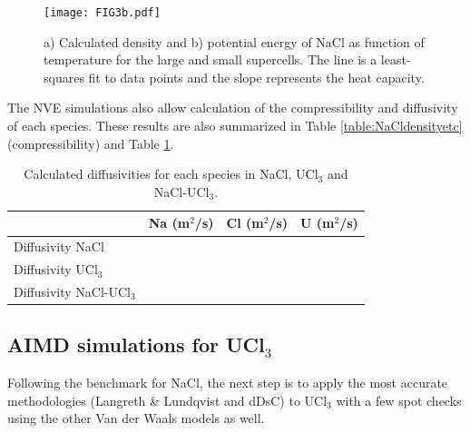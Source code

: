 \documentclass[preprint,3p,10pt,twocolumn,number,sort&compress]{elsarticle}
\begin{document}
\begin{figure}[htb]
\centering
\texttt{[image: FIG3b.pdf]}
\caption{a) Calculated density and b) potential energy of NaCl as function of temperature for the large and small supercells. The line is a least-squares fit to data points and the slope represents the heat capacity.} 
\label{fig:NaClsize}
\end{figure}


The NVE simulations also allow calculation of the compressibility and diffusivity of each species. These results are also summarized in Table \ref{table:NaCldensityetc} (compressibility) and Table \ref{table:NaCldiffusivityetc}.

 \begin{table}[hb!]
\centering
\begin{tabular}{lccc}
\hline
\hline
&Na	(m$^2$/s)&Cl (m$^2$/s)&U (m$^2$/s)\\
\hline
Diffusivity NaCl & & &\\
Diffusivity UCl$_3$	& & &\\
Diffusivity NaCl-UCl$_3$ & & &\\
\hline
\hline
\end{tabular}
\caption{Calculated diffusivities for each species in NaCl, UCl$_3$ and  NaCl-UCl$_3$.}
\label{table:NaCldiffusivityetc}
\end{table}

\subsection{AIMD simulations for UCl$_3$}
Following the benchmark for NaCl, the next step is to apply the most accurate methodologies (Langreth \& Lundqvist and dDsC) to UCl$_3$ with a few spot checks using the other Van der Waals models as well. 
\end{document}
